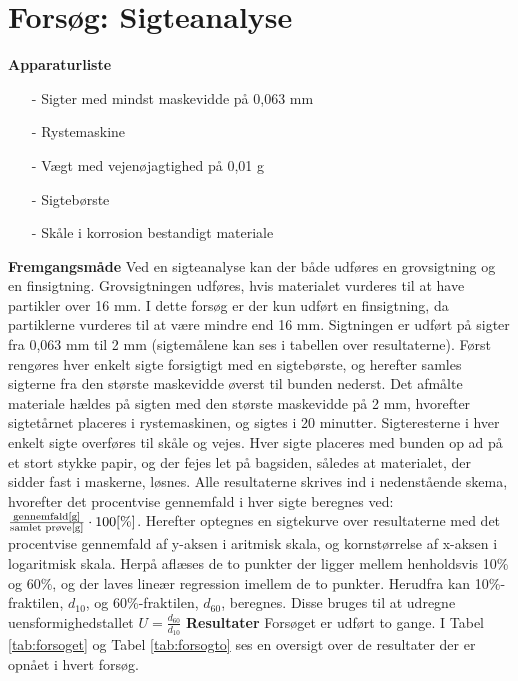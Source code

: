 \chapter{Forsøg: Sigteanalyse}

\textbf{Apparaturliste}
\begin{itemize}
	\item[-] Sigter med mindst maskevidde på 0,063 mm
	\item[-] Rystemaskine
	\item[-] Vægt med vejenøjagtighed på 0,01 g
	\item[-] Sigtebørste
	\item[-] Skåle i korrosion bestandigt materiale
\end{itemize}
\textbf{Fremgangsmåde}
\newline
Ved en sigteanalyse kan der både udføres en grovsigtning og en finsigtning. Grovsigtningen udføres, hvis materialet vurderes til at have partikler over 16 mm. I dette forsøg er der kun udført en finsigtning, da partiklerne vurderes til at være mindre end 16 mm. Sigtningen er udført på sigter fra 0,063 mm til 2 mm (sigtemålene kan ses i tabellen over resultaterne). 
\newline \indent{     }   Først rengøres hver enkelt sigte forsigtigt med en sigtebørste, og herefter samles sigterne fra den største maskevidde øverst til bunden nederst. Det afmålte materiale hældes på sigten med den største maskevidde på 2 mm, hvorefter sigtetårnet placeres i rystemaskinen, og sigtes i 20 minutter.
\newline \indent{     }   Sigteresterne i hver enkelt sigte overføres til skåle og vejes. Hver sigte placeres med bunden op ad på et stort stykke papir, og der fejes let på bagsiden, således at materialet, der sidder fast i maskerne, løsnes.
\newline \indent{     }   Alle resultaterne skrives ind i nedenstående skema, hvorefter det procentvise gennemfald i hver sigte beregnes ved: $\frac{\text{gennemfald} [\text{g}]}{\textup{samlet prøve} [\text{g}]}\cdot 100 [\%]$. Herefter optegnes en sigtekurve over resultaterne med det procentvise gennemfald af y-aksen i aritmisk skala, og kornstørrelse af x-aksen i logaritmisk skala. Herpå aflæses de to punkter der ligger mellem henholdsvis 10\% og 60\%, og der laves lineær regression imellem de to punkter. Herudfra kan 10\%-fraktilen, $d_{10}$, og 60\%-fraktilen, $d_{60}$, beregnes. Disse bruges til at udregne uensformighedstallet $U = \frac{d_{60}}{d_{10}}$
\newline
\newline
\textbf{Resultater}
\newline
Forsøget er udført to gange. I Tabel \ref{tab:forsoget} og Tabel \ref{tab:forsogto} ses en oversigt over de resultater der er opnået i hvert forsøg. 

